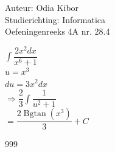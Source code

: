 \documentclass[a4paper]{article}
\begin{document}
  
\noindent \large Auteur: Odia Kibor \\
\noindent \large Studierichting: Informatica\\
\noindent \large Oefeningenreeks 4A nr. 28.4\\

\medskip

\normalsize


$\displaystyle\int \dfrac{2x^2 dx}{x^6 + 1}$\\

$u = x^3$\\

$du = 3x^2 dx$\\

$\Rightarrow \dfrac{2}{3} \displaystyle\int \dfrac{1}{u^2 + 1}$\\

$= \dfrac{2\operatorname{Bgtan}(x^3)}{3} + C$\\



















\begin{thebibliography}{999}
\end{thebibliography}
\end{document}
